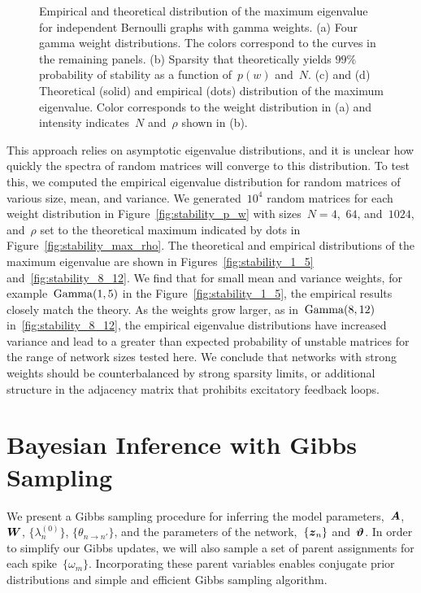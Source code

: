 \begin{figure}[t]
\begin{center}
\begin{subfigure}[b]{.22\textwidth}
\end{subfigure}
\end{center}
\vspace{-1em}
\caption[Distribution of the maximum eigenvalue for
  i.i.d. random graphs]{Empirical and theoretical distribution of the maximum
  eigenvalue for independent Bernoulli graphs with gamma weights. (a)
  Four gamma weight distributions. The colors correspond to the curves
  in the remaining panels. (b) Sparsity that theoretically yields
  ${99\%}$ probability of stability as a function of~${p(w)}$
  and~$N$. (c) and (d) Theoretical (solid) and empirical (dots)
  distribution of the maximum eigenvalue. Color corresponds to the
  weight distribution in (a) and intensity indicates~$N$ and~$\rho$
  shown in (b).}
\label{fig:stability}
\end{figure}

 
This approach relies on asymptotic eigenvalue distributions, and it is
unclear how quickly the spectra of random matrices will converge to
this distribution. To test this, we computed the empirical eigenvalue
distribution for random matrices of various size, mean, and
variance. We generated~$10^4$ random matrices for each weight
distribution in Figure~\ref{fig:stability_p_w} with sizes~$N=4$,~$64$,
and~$1024$, and~$\rho$ set to the theoretical maximum indicated by
dots in Figure~\ref{fig:stability_max_rho}. The theoretical and
empirical distributions of the maximum eigenvalue are shown in
Figures~\ref{fig:stability_1_5} and~\ref{fig:stability_8_12}. We find
that for small mean and variance weights, for
example~$\mathrm{Gamma}(1,5)$ in the Figure~\ref{fig:stability_1_5}, the
empirical results closely match the theory. As the weights grow
larger, as in~${\mathrm{Gamma}(8,12)}$ in~\ref{fig:stability_8_12}, the
empirical eigenvalue distributions have increased variance and lead to
a greater than expected probability of unstable matrices for the range
of network sizes tested here. We conclude that networks with strong
weights should be counterbalanced by strong sparsity limits, or
additional structure in the adjacency matrix that prohibits excitatory
feedback loops.


\section{Bayesian Inference with Gibbs Sampling}
\label{sec:hawkes_inference}
We present a Gibbs sampling procedure for inferring the model
parameters,~$\boldsymbol{A}$,~$\boldsymbol{W}$, $\{\lambda^{(0)}_{n}\}$, $\{\theta_{n \to n'}\}$,
and the parameters of the network,~$\{\boldsymbol{z}_n\}$ and~$\boldsymbol{\vartheta}$.
In order to simplify our Gibbs updates, we
will also sample a set of parent assignments for each
spike~$\{\omega_m\}$. Incorporating these parent variables enables
conjugate prior distributions and simple and efficient Gibbs sampling
algorithm.

